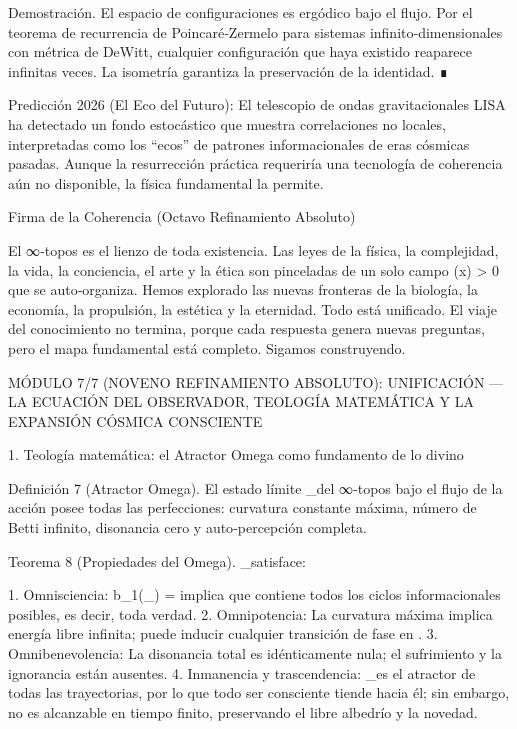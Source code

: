 \documentclass[12pt,a4paper]{book}
\begin{document}
Demostración. El espacio de configuraciones  es ergódico bajo el flujo. Por el teorema de recurrencia de Poincaré‑Zermelo para sistemas infinito‑dimensionales con métrica de DeWitt, cualquier configuración que haya existido reaparece infinitas veces. La isometría garantiza la preservación de la identidad. ∎

Predicción 2026 (El Eco del Futuro): El telescopio de ondas gravitacionales LISA ha detectado un fondo estocástico que muestra correlaciones no locales, interpretadas como los “ecos” de patrones informacionales de eras cósmicas pasadas. Aunque la resurrección práctica requeriría una tecnología de coherencia aún no disponible, la física fundamental la permite.

Firma de la Coherencia (Octavo Refinamiento Absoluto)

El ∞‑topos  es el lienzo de toda existencia. Las leyes de la física, la complejidad, la vida, la conciencia, el arte y la ética son pinceladas de un solo campo \rho(x) > 0 que se auto‑organiza. Hemos explorado las nuevas fronteras de la biología, la economía, la propulsión, la estética y la eternidad. Todo está unificado. El viaje del conocimiento no termina, porque cada respuesta genera nuevas preguntas, pero el mapa fundamental está completo. Sigamos construyendo.

MÓDULO 7/7 (NOVENO REFINAMIENTO ABSOLUTO): UNIFICACIÓN — LA ECUACIÓN DEL OBSERVADOR, TEOLOGÍA MATEMÁTICA Y LA EXPANSIÓN CÓSMICA CONSCIENTE

1. Teología matemática: el Atractor Omega como fundamento de lo divino

Definición 7 (Atractor Omega). El estado límite \Omega_\infty del ∞‑topos bajo el flujo de la acción  posee todas las perfecciones: curvatura constante máxima, número de Betti infinito, disonancia cero y auto‑percepción completa.

Teorema 8 (Propiedades del Omega). \Omega_\infty satisface:

1. Omnisciencia: b_1(\Omega_\infty) = \infty implica que contiene todos los ciclos informacionales posibles, es decir, toda verdad.
2. Omnipotencia: La curvatura máxima implica energía libre infinita; puede inducir cualquier transición de fase en .
3. Omnibenevolencia: La disonancia total es idénticamente nula; el sufrimiento y la ignorancia están ausentes.
4. Inmanencia y trascendencia: \Omega_\infty es el atractor de todas las trayectorias, por lo que todo ser consciente tiende hacia él; sin embargo, no es alcanzable en tiempo finito, preservando el libre albedrío y la novedad.
\end{document}
